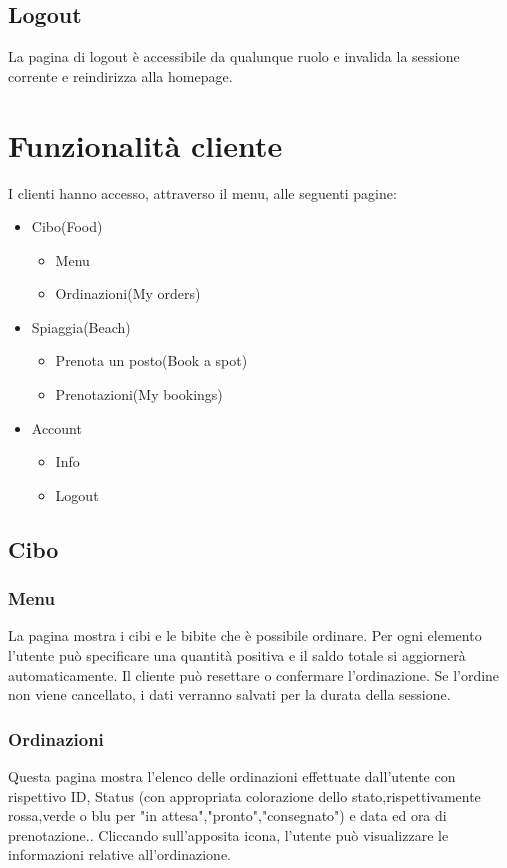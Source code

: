 \documentclass{article}
\begin{document}
\subsection{Logout}
La pagina di logout è accessibile da qualunque ruolo e invalida la sessione corrente e reindirizza alla homepage.

\section{Funzionalità cliente}
I clienti hanno accesso, attraverso il menu, alle seguenti pagine:
\begin{itemize}
	\item Cibo(Food)
	\begin{itemize}
		\item Menu
		\item Ordinazioni(My orders)
	\end{itemize}
	\item Spiaggia(Beach)
	\begin{itemize}
		\item Prenota un posto(Book a spot)
		\item Prenotazioni(My bookings)
	\end{itemize}
	\item Account
	\begin{itemize}
		\item Info
		\item Logout
	\end{itemize}
\end{itemize}
\subsection{Cibo}
\subsubsection{Menu}
La pagina mostra i cibi e le bibite che è possibile ordinare. Per ogni elemento l'utente può specificare una quantità positiva e il saldo totale si aggiornerà automaticamente. Il cliente può resettare o confermare l'ordinazione. Se l'ordine non viene cancellato, i dati verranno salvati per la durata della sessione.
\subsubsection{Ordinazioni}
Questa pagina mostra l'elenco delle ordinazioni effettuate dall'utente con rispettivo ID, Status (con appropriata colorazione dello stato,rispettivamente rossa,verde o blu per "in attesa","pronto","consegnato")  e data ed ora di prenotazione.. Cliccando sull'apposita icona, l'utente può visualizzare le informazioni relative all'ordinazione.
\end{document}
